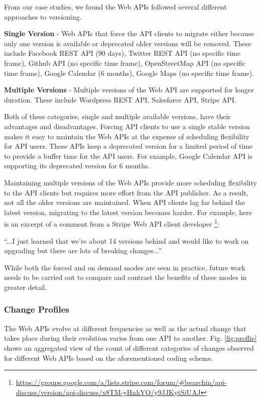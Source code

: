 \documentclass[conference]{IEEEtran}
\begin{document}
From our case studies, we found the Web APIs followed several different approaches to versioning.

\textbf{Single Version} - Web APIs that force the API clients to migrate either because only one version is available or deprecated older versions will be removed. These include Facebook REST API (90 days), Twitter REST API (no specific time frame), Github API (no specific time frame), OpenStreetMap API (no specific time frame), Google Calendar (6 months), Google Maps (no specific time frame).

\textbf{Multiple Versions} - Multiple versions of the Web API are supported for longer duration. These include Wordpress REST API, Salesforce API, Stripe API.

Both of these categories, single and multiple available versions, have their advantages and disadvantages. Forcing API clients to use a single stable version makes it easy to maintain the Web APIs at the expense of scheduling flexibility for API users. These APIs keep a deprecated version for a limited period of time to provide a buffer time for the API users. For example, Google Calendar API is supporting its deprecated version for 6 months.

Maintaining multiple versions of the Web APIs provide more scheduling flexibility to the API clients but requires more effort from the API publisher. As a result, not all the older versions are maintained. When API clients lag far behind the latest version, migrating to the latest version becomes harder. For example, here is an excerpt of a comment from a Stripe Web API client developer \footnote{\url{https://groups.google.com/a/lists.stripe.com/forum/#!searchin/api-discuss/version/api-discuss/x8TM-yHnhYQ/y9JJKytSiUAJ}}:

\small
``...I just learned that we're about 14 versions behind and would like to work on upgrading but there are lots of breaking changes...''
\normalsize

While both the forced and on demand modes are seen in practice, future work needs to be carried out to compare and contrast the benefits of these modes in greater detail.



\subsubsection{Change Profiles}
The Web APIs evolve at different frequencies as well as the actual change that takes place during their evolution varies from one API to another. Fig. \ref{fig:proflie} shows an aggregated view of the count of different categories of changes observed for different Web APIs based on the aforementioned coding scheme.
\end{document}
